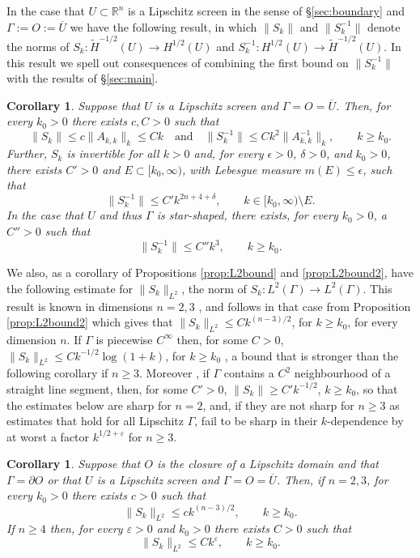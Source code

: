 \documentclass{birkjour}
\newtheorem{corollary}[theorem]{Corollary}
\theoremstyle{definition}
\theoremstyle{remark}
\numberwithin{equation}{section}
\newcommand{\eps}{\varepsilon}
\newcommand{\R}{\mathbb{R}}
\begin{document}
In the case that  $U\subset \R^n$ is a Lipschitz screen  in the sense of \S\ref{sec:boundary} and $\Gamma := O := \overline{U}$ we have the following result, in which $\|S_k\|$ and $\|S_k^{-1}\|$ denote the norms of $S_k:\widetilde H^{-1/2}(U)\to H^{1/2}(U)$ and $S_k^{-1}:H^{1/2}(U)\to \widetilde H^{-1/2}(U)$. In this result we spell out consequences of combining the first bound on $\|S_k^{-1}\|$ with the results of \S\ref{sec:main}.
\begin{corollary} \label{thm:Sk} 
Suppose that $U$ is a Lipschitz screen and $\Gamma=O=\overline{U}$. Then, for every $k_0>0$ there exists $c,C>0$ such that
$$
\|S_k\| \leq c\|A_{k,k}\|_k \leq Ck \quad \mbox{and} \quad \|S_k^{-1}\| \leq Ck^2 \|A_{k,k}^{-1}\|_k, \qquad k\geq k_0.
$$
Further, $S_k$ is invertible for all $k>0$ and, for every $\epsilon>0$, $\delta>0$, and $k_0>0$, there exists $C'>0$ and $E\subset [k_0,\infty)$, with Lebesgue measure $m(E)\leq \epsilon$, such that
\begin{equation} \label{eq:boundsSkgen}
\|S_k^{-1}\|\leq C'k^{2n+4+\delta}, \qquad k\in [k_0,\infty)\setminus E.
\end{equation}
In the case that $U$ and thus $\Gamma$ is star-shaped, there exists, for every $k_0>0$, a $C''>0$ such that 
\begin{equation} \label{eq:Skss}
\|S_k^{-1}\|\leq C''k^3, \qquad k\geq k_0.
\end{equation}
\end{corollary}


We also, as a corollary of Propositions \ref{prop:L2bound} and \ref{prop:L2bound2}, have the following estimate for $\|S_k\|_{L^2}$,  the norm of $S_k:L^2(\Gamma)\to L^2(\Gamma)$. This result is known in dimensions $n=2,3$ \cite[Theorem 3.3]{ChGrLaLi:09}, and follows in that case from Proposition \ref{prop:L2bound2} which gives that $\|S_k\|_{L^2}\leq C k^{(n-3)/2}$, for $k\geq k_0$, for every dimension $n$. If $\Gamma$ is piecewise $C^\infty$ then, for some $C>0$, $\|S_k\|_{L^2} \leq C k^{-1/2}\log(1+k)$, for $k\geq k_0$ \cite{HaTa:15}, a bound that is stronger than the following corollary if $n\geq 3$. Moreover \cite{HaTa:15,GaSp2019}, if $\Gamma$ contains a $C^2$ neighbourhood of a straight line segment, then, for some $C'>0$, $\|S_k\|\geq C' k^{-1/2}$, $k\geq k_0$, so that the estimates below are sharp for $n=2$, and, if they are not sharp for $n\geq 3$ as estimates that hold for all Lipschitz $\Gamma$, fail to be sharp in their $k$-dependence by at worst a factor $k^{1/2+\eps}$ for $n\geq 3$.
\begin{corollary} \label{cor:L2}
Suppose that $O$ is the closure of a  Lipschitz domain and that $\Gamma=\partial O$ or that $U$ is a Lipschitz screen and $\Gamma=O=\overline{U}$. Then, if $n=2,3$, for every $k_0>0$ there exists $c>0$ such that
$$
\|S_k\|_{L^2} \leq c k^{(n-3)/2}, \qquad k\geq k_0.
$$   
If $n\geq 4$ then, for every $\eps>0$ and $k_0>0$ there exists $C>0$ such that
$$
\|S_k\|_{L^2} \leq C k^\eps, \qquad k\geq k_0.
$$
\end{corollary}
\end{document}
